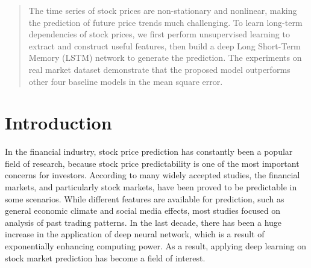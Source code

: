 \documentclass{article}
\begin{document}
 


\begin{abstract} 
The time series of stock prices are non-stationary and nonlinear, making the prediction of future price trends much challenging. To learn long-term dependencies of stock prices, we first perform unsupervised learning to extract and construct useful features, then build a deep Long Short-Term Memory (LSTM) network to generate the prediction. The experiments on real market dataset demonstrate that the proposed model outperforms other four baseline models in the mean square error.
\end{abstract} 

\section{Introduction}

In the financial industry, stock price prediction has constantly been a popular field of research, because stock price predictability is one of the most important concerns for investors. According to many widely accepted studies, the financial markets, and particularly stock markets, have been proved to be predictable in some scenarios. While different features are available for prediction, such as general economic climate and social media effects, most studies focused on analysis of past trading patterns. In the last decade, there has been a huge increase in the application of deep neural network, which is a result of exponentially enhancing computing power. As a result, applying deep learning on stock market prediction has become a field of interest.
\end{document}
